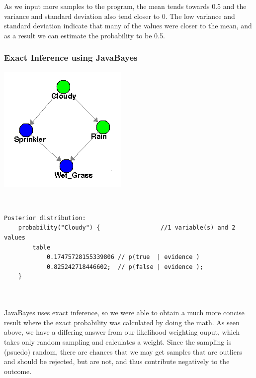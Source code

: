 \documentclass{article}
\begin{document}
As we input more samples to the program, the mean tends towards 0.5 and the variance and standard deviation also tend closer to 0. The low variance and standard deviation indicate that many of the values were closer to the mean, and as a result we can estimate the probability to be 0.5. \\

\subsubsection{Exact Inference using JavaBayes}
\begin{minipage}{\linewidth}
\begin{center}
\includegraphics[scale=0.7]{part4_bn}
\end{center}
\end{minipage}\\


\begin{minipage}{\linewidth}
\begin{lstlisting}
Posterior distribution:
	probability("Cloudy") {                 //1 variable(s) and 2 values
		table 
			0.17475728155339806	// p(true  | evidence )
			0.825242718446602; 	// p(false | evidence );
	}
\end{lstlisting}
\end{minipage}\\
\\
JavaBayes uses exact inference, so we were able to obtain a much more concise result where the exact probability was calculated by doing the math. As seen above, we have a differing answer from our likelihood weighting ouput, which takes only random sampling and calculates a weight. Since the sampling is (psuedo) random, there are chances that we may get samples that are outliers and should be rejected, but are not, and thus contribute negatively to the outcome.
\end{document}
